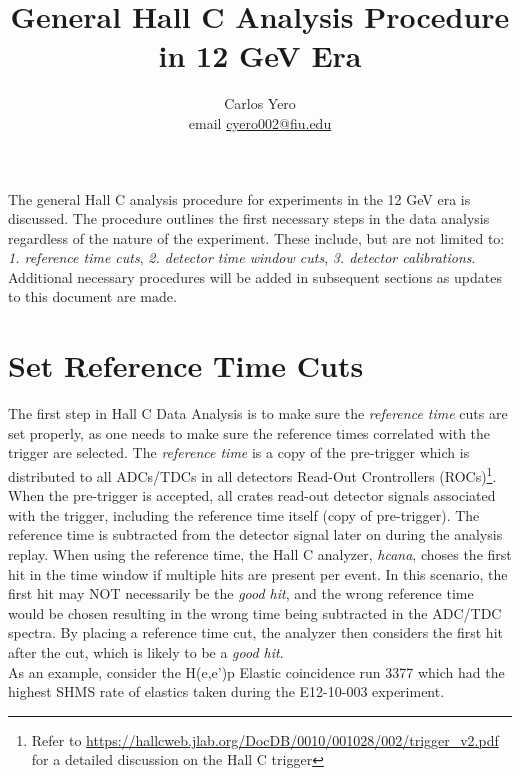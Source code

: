 \documentclass[14pt]{article}
\begin{document}
 
 
\title{\textbf{General Hall C Analysis Procedure in 12 GeV Era}}%
\author{Carlos Yero \\ email \href{mailto:cyero002@fiu.edu}{cyero002@fiu.edu}} %
 
\maketitle
\noindent The general Hall C analysis procedure for experiments in the 12 GeV era is discussed. The procedure
outlines the first necessary steps in the data analysis regardless of the nature of the experiment. These include, but are not
limited to: \\ \textit{1. reference time cuts}, \textit{2. detector time window cuts}, \textit{3. detector calibrations}.
Additional necessary procedures will be added in subsequent sections as updates to this document are made.

\section{Set Reference Time Cuts}\label{sec:ref_time_cuts}
\noindent The first step in Hall C Data Analysis is to make sure the \textit{reference time}  cuts are set properly,
as one needs to make sure the reference times correlated with the trigger are selected. The \textit{reference time}
is a copy of the pre-trigger which is distributed to all ADCs/TDCs in all detectors Read-Out Crontrollers (ROCs)\footnote{Refer to \url{https://hallcweb.jlab.org/DocDB/0010/001028/002/trigger_v2.pdf} for a detailed discussion on the Hall C trigger}. When the pre-trigger
is accepted, all crates read-out detector signals associated with the trigger, including the reference time itself (copy of pre-trigger). The
reference time is subtracted from the detector signal later on during the analysis replay. When using the reference time,
the Hall C analyzer, \textit{hcana}, choses the first hit in the time window if multiple hits are present per event. In this scenario, the first hit may NOT
necessarily be the \textit{good hit}, and the wrong reference time would be chosen resulting in the wrong time being subtracted in the ADC/TDC spectra.
By placing a reference time cut, the analyzer then considers the first hit after the cut, which is likely to be a \textit{good hit}. \\
\indent As an example, consider the H(e,e')p Elastic coincidence run 3377 which had the highest SHMS rate of elastics taken during the E12-10-003 experiment.
\end{document}
